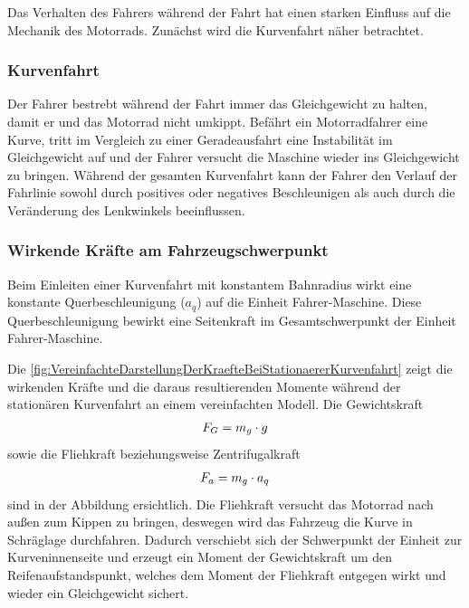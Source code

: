 Das Verhalten des Fahrers während der Fahrt hat einen starken Einfluss auf die Mechanik des Motorrads. Zunächst wird die Kurvenfahrt näher betrachtet.

\subsubsection{Kurvenfahrt} 

Der Fahrer bestrebt während der Fahrt immer das Gleichgewicht zu halten, damit er und das Motorrad nicht umkippt.
Befährt ein Motorradfahrer eine Kurve, tritt im Vergleich zu einer Geradeausfahrt eine Instabilität im Gleichgewicht auf und der Fahrer versucht die Maschine wieder ins Gleichgewicht zu bringen. Während der gesamten Kurvenfahrt kann der Fahrer den Verlauf der Fahrlinie sowohl durch positives oder negatives Beschleunigen als auch durch die Veränderung des Lenkwinkels beeinflussen. \citep{Haedrich2012} 


\subsubsection{Wirkende Kräfte am Fahrzeugschwerpunkt}

Beim Einleiten einer Kurvenfahrt mit konstantem Bahnradius wirkt eine konstante Querbeschleunigung ($a_q$) auf die Einheit \glqq Fahrer-Maschine\grqq{}. Diese Querbeschleunigung bewirkt eine Seitenkraft im Gesamtschwerpunkt der Einheit \glqq Fahrer-Maschine\grqq{}. %

Die \autoref{fig:VereinfachteDarstellungDerKraefteBeiStationaererKurvenfahrt} zeigt die wirkenden Kräfte und die daraus resultierenden Momente während der stationären Kurvenfahrt an einem vereinfachten Modell. Die Gewichtskraft 
\begin{align*}
	\centering
	F_G = m_g \cdot g
\end{align*}
sowie die Fliehkraft beziehungsweise Zentrifugalkraft 
\begin{align*}
	\centering
	F_a = m_g \cdot a_q
\end{align*}
sind in der Abbildung ersichtlich. Die Fliehkraft versucht das Motorrad nach außen zum Kippen zu bringen, deswegen wird das Fahrzeug die Kurve in Schräglage durchfahren. Dadurch verschiebt sich der Schwerpunkt der Einheit zur Kurveninnenseite und erzeugt ein Moment der Gewichtskraft um den Reifenaufstandspunkt, welches dem Moment der Fliehkraft entgegen wirkt und wieder ein Gleichgewicht sichert.


